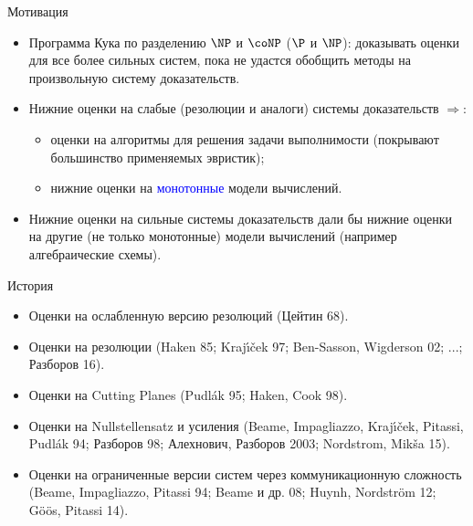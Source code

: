\begin{frame}{Мотивация}

    \begin{itemize}
        \item Программа Кука по разделению $\NP$ и $\coNP$ ($\P$ и $\NP$): доказывать оценки для
            {\color{blue} все более сильных} систем, пока не удастся обобщить методы на произвольную
            систему доказательств.
        \pause
        \item Нижние оценки на {\color{blue} слабые} (резолюции и аналоги) системы доказательств
            $\Rightarrow$:
            \begin{itemize}
                \item оценки на алгоритмы для решения задачи выполнимости (покрывают большинство
                    применяемых эвристик);
                \item нижние оценки на \textcolor{blue}{монотонные} модели вычислений.
            \end{itemize}
        \pause
        \item Нижние оценки на {\color{blue} сильные} системы доказательств дали бы нижние оценки на
            другие (не только монотонные) модели вычислений (например алгебраические схемы).
    \end{itemize}
\end{frame}


\begin{frame}{История}

    \begin{itemize}
        \item Оценки на ослабленную версию резолюций (Цейтин 68).
        \pause
        \item Оценки на резолюции (Haken 85; Kraj{\'{\i}}{\v{c}}ek 97; Ben-Sasson, Wigderson 02; ...;
            Разборов 16).
        \pause
        \item Оценки на Cutting Planes (Pudl{\'{a}}k 95; Haken, Cook 98).
        \pause
        \item Оценки на Nullstellensatz и усиления (Beame, Impagliazzo, Kraj{\'{\i}}{\v{c}}ek, Pitassi,
            Pudl{\'{a}}k 94; Разборов 98; Алехнович, Разборов 2003; Nordstrom, Mik{\v{s}}a 15).
        \pause
        \item Оценки на ограниченные версии систем через коммуникационную сложность (Beame, Impagliazzo,
            Pitassi 94; Beame и др. 08; Huynh, Nordstr{\"{o}}m 12; G{\"{o}}{\"{o}}s, Pitassi 14).
    \end{itemize}

\end{frame}

